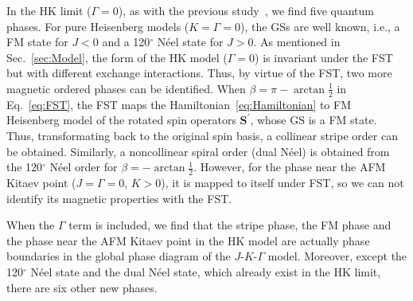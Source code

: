 \documentclass[aps,prb,reprint,amsfonts,amsmath,amssymb,showpacs,groupedaddress,superscriptaddress]{revtex4-1}
\begin{document}
In the HK limit ($\Gamma=0$), as with the previous study~\cite{KaiLi2015}, we find five quantum phases. For pure Heisenberg models ($K=\Gamma=0$), the GSs are well known, i.e., a FM state for $J<0$ and a 120$^\circ$ N\'{e}el state for $J>0$. As mentioned in Sec.~\ref{sec:Model}, the form of the HK model ($\Gamma=0$) is invariant under the FST~\cite{PhysRevB.89.014414} but with different exchange interactions. Thus, by virtue of the FST, two more magnetic ordered phases can be identified. When $\beta=\pi - \arctan\frac{1}{2}$ in Eq.~\eqref{eq:FST}, the FST maps the Hamiltonian~\eqref{eq:Hamiltonian} to FM Heisenberg model of the rotated spin operators $\bm{S}^{\prime}$, whose GS is a FM state. Thus, transformating back to the original spin basis, a collinear stripe order can be obtained. Similarly, a noncollinear spiral order (dual N\'{e}el) is obtained from the 120$^\circ$ N\'{e}el order for $\beta=-\arctan\frac{1}{2}$. However, for the phase near the AFM Kitaev point ($J=\Gamma=0$, $K>0$), it is mapped to itself under FST, so we can not identify its magnetic properties with the FST.

When the $\Gamma$ term is included, we find that the stripe phase, the FM phase and the phase near the AFM Kitaev point in the HK model are actually phase boundaries in the global phase diagram of the $J$-$K$-$\Gamma$ model. Moreover, except the 120$^\circ$ N\'{e}el state and the dual N\'{e}el state, which already exist in the HK limit, there are six other new phases.
\end{document}
